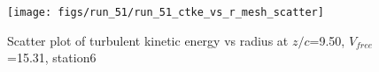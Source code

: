 \begin{figure}[H]
\centering
\texttt{[image: figs/run\_51/run\_51\_ctke\_vs\_r\_mesh\_scatter]}
\caption{Scatter plot of turbulent kinetic energy vs radius at $z/c$=9.50, $V_{free}$=15.31, station6}
\label{fig:run_51_ctke_vs_r_mesh_scatter}
\end{figure}


